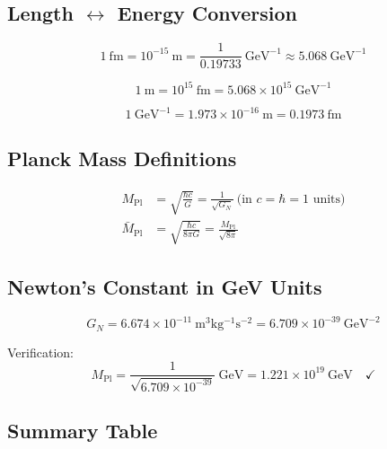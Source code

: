 \documentclass[11pt,a4paper]{article}
\newcommand{\Mpl}{M_{\mathrm{Pl}}}
\newcommand{\Mplbar}{\bar{M}_{\mathrm{Pl}}}
\newcommand{\GN}{G_N}
\newcommand{\hbarc}{\hbar c}
\begin{document}
\subsection{Length $\leftrightarrow$ Energy Conversion}

\begin{equation}
1~\mathrm{fm} = 10^{-15}~\mathrm{m} = \frac{1}{0.19733}~\mathrm{GeV}^{-1} \approx 5.068~\mathrm{GeV}^{-1}
\label{eq:fm-GeV}
\end{equation}

\begin{equation}
1~\mathrm{m} = 10^{15}~\mathrm{fm} = 5.068 \times 10^{15}~\mathrm{GeV}^{-1}
\label{eq:m-GeV-conversion}
\end{equation}

\begin{equation}
1~\mathrm{GeV}^{-1} = 1.973 \times 10^{-16}~\mathrm{m} = 0.1973~\mathrm{fm}
\label{eq:GeV-m-conversion}
\end{equation}

\subsection{Planck Mass Definitions}

\begin{align}
\Mpl &= \sqrt{\frac{\hbarc}{G}} = \frac{1}{\sqrt{\GN}}~\text{(in } c = \hbar = 1 \text{ units)}
\label{eq:Mpl-def}\\
\Mplbar &= \sqrt{\frac{\hbarc}{8\pi G}} = \frac{\Mpl}{\sqrt{8\pi}}
\label{eq:Mplbar-def}
\end{align}

\subsection{Newton's Constant in GeV Units}

\begin{equation}
\GN = 6.674 \times 10^{-11}~\mathrm{m^3 kg^{-1} s^{-2}}
= 6.709 \times 10^{-39}~\mathrm{GeV}^{-2}
\label{eq:GN-GeV}
\end{equation}

Verification:
\begin{equation}
\Mpl = \frac{1}{\sqrt{6.709 \times 10^{-39}}}~\mathrm{GeV} = 1.221 \times 10^{19}~\mathrm{GeV}
\quad \checkmark
\label{eq:Mpl-verify}
\end{equation}

\subsection{Summary Table}
\end{document}
